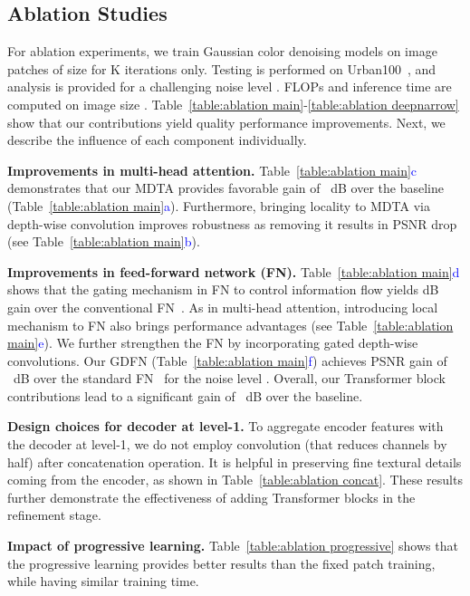 \documentclass[10pt,twocolumn,letterpaper]{article}
\begin{document}
 





\subsection{Ablation Studies}
For ablation experiments, we train Gaussian color denoising models on image patches of size  for K iterations only. Testing is performed on Urban100~\cite{huang2015single_urban100}, and analysis is provided for a challenging noise level . FLOPs and inference time are computed on image size . Table~\ref{table:ablation main}-\ref{table:ablation deepnarrow} show that our contributions yield quality performance improvements. Next, we describe the influence of each component individually.

\noindent \textbf{Improvements in multi-head attention.} Table~\ref{table:ablation main}{\textcolor{blue}{c}} demonstrates that our MDTA provides favorable gain of ~dB over the baseline (Table~\ref{table:ablation main}{\textcolor{blue}{a}}). Furthermore, bringing locality to MDTA via depth-wise convolution improves robustness as removing it results in PSNR drop (see Table~\ref{table:ablation main}{\textcolor{blue}{b}}).

\noindent \textbf{Improvements in feed-forward network (FN).} Table~\ref{table:ablation main}{\textcolor{blue}{d}} shows that the gating mechanism in FN to control information flow yields  dB gain over the conventional FN~\cite{vaswani2017attention}. As in multi-head attention, introducing local mechanism to FN also brings performance advantages (see  Table~\ref{table:ablation main}{\textcolor{blue}{e}}). We further strengthen the FN by incorporating gated depth-wise convolutions. Our GDFN (Table~\ref{table:ablation main}{\textcolor{blue}{f}}) achieves PSNR gain of ~dB over the standard FN~\cite{vaswani2017attention} for the noise level . Overall, our Transformer block contributions lead to {a} significant gain of ~dB over the baseline.   

\noindent \textbf{Design choices for decoder at level-1.}
To aggregate encoder features with the decoder at level-1, we do not employ  convolution (that reduces channels by half) after concatenation operation. It is helpful in preserving fine textural details coming from the encoder, as shown in 
Table~\ref{table:ablation concat}.  These results further demonstrate the effectiveness of adding Transformer blocks in the refinement stage.


\noindent \textbf{Impact of progressive learning.} 
Table~\ref{table:ablation progressive} shows that the progressive learning provides better results than the fixed patch training, while having similar training time.   
\end{document}
